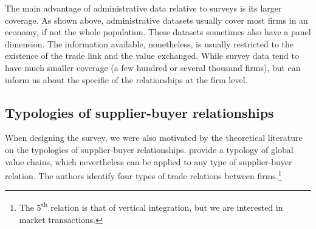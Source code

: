 \documentclass[final, dvipsnames, authoryear,12pt]{elsarticle}
\begin{document}
The main advantage of administrative data relative to surveys is its larger coverage. As shown above, administrative datasets usually cover most firms in an economy, if not the whole population. These datasets sometimes also have a panel dimension. The information available, nonetheless, is usually restricted to the existence of the trade link and the value exchanged. While survey data tend to have much smaller coverage (a few hundred or several thousand firms), but can inform us about the specific of the relationships at the firm level.




\subsection{Typologies of supplier-buyer relationships}
\label{sec:typologies}

When designing the survey, we were also motivated by the theoretical literature on the typologies of supplier-buyer relationships.  \cite{gereffi2005governance} provide a typology of global value chains, which nevertheless can be applied to any type of supplier-buyer relation. The authors identify four types of trade relations between firms.\footnote{The 5\textsuperscript{th} relation is that of vertical integration, but we are interested in market transactions.}
\end{document}
